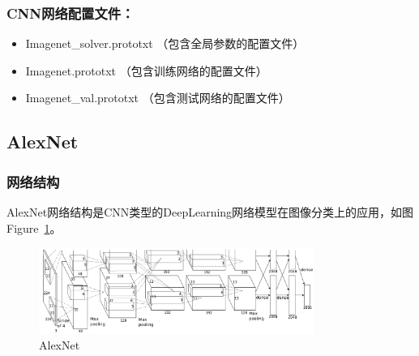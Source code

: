 \documentclass[12pt]{article}
\begin{document}
\subsubsection{CNN网络配置文件：}
\begin{itemize}
\item Imagenet\_solver.prototxt （包含全局参数的配置文件）
\item Imagenet.prototxt （包含训练网络的配置文件）
\item Imagenet\_val.prototxt （包含测试网络的配置文件）
\end{itemize}



\subsection{AlexNet}
\subsubsection{网络结构}
AlexNet网络结构是CNN类型的DeepLearning网络模型在图像分类上的应用，如图Figure~\ref{fig:framework}。

\begin{figure}[!ht]
\centering
\includegraphics[width=0.8\textwidth]{AlexNet}
\caption{AlexNet}
\label{fig:framework}
\end{figure}
\end{document}
